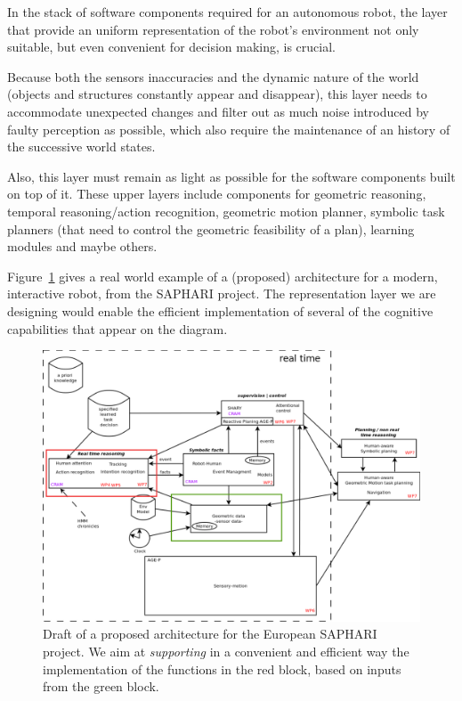 \documentclass[a4paper]{article}
\begin{document}
In the stack of software components required for an autonomous robot, the
layer that provide an uniform representation of the robot's environment not
only suitable, but even convenient for decision making, is crucial.

Because both the sensors inaccuracies and the dynamic nature of the world
(objects and structures constantly appear and disappear), this layer needs to
accommodate unexpected changes and filter out as much noise introduced by faulty
perception as possible, which also require the maintenance of an history of
the successive world states.

Also, this layer must remain as light as possible for the software components
built on top of it.  These upper layers include components for geometric
reasoning, temporal reasoning/action recognition, geometric motion planner,
symbolic task planners (that need to control the geometric feasibility of a
plan), learning modules and maybe others.

Figure~\ref{fig|saphari} gives a real world example of a (proposed)
architecture for a modern, interactive robot, from the SAPHARI project. The
representation layer we are designing would enable the efficient implementation
of several of the cognitive capabilities that appear on the diagram.

\begin{figure}[!h]
    \centering
    \includegraphics[width=\columnwidth]{images/saphari-focused.pdf}

    \caption{Draft of a proposed architecture for the European SAPHARI project.
    We aim at \emph{supporting} in a convenient and efficient way the implementation of the
    functions in the red block, based on inputs from the green block.}

    \label{fig|saphari}
\end{figure}
\end{document}
